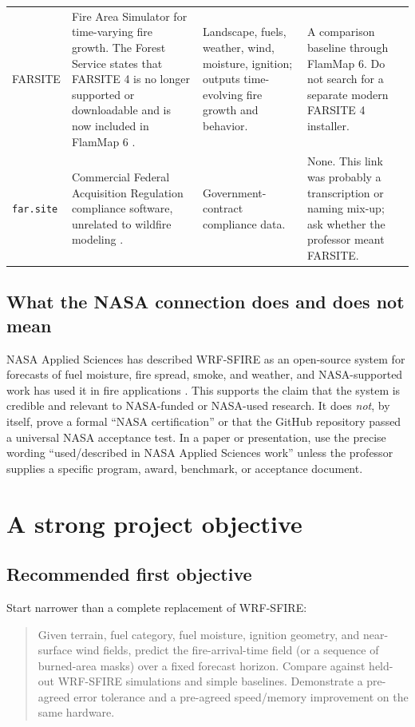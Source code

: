 \documentclass[11pt]{article}
\begin{document}
\begin{longtable}{p{}p{}p{}p{}}
\addlinespace
FARSITE & Fire Area Simulator for time-varying fire growth. The Forest Service states that FARSITE 4 is no longer supported or downloadable and is now included in FlamMap 6 \cite{farsite}. & Landscape, fuels, weather, wind, moisture, ignition; outputs time-evolving fire growth and behavior. & A comparison baseline through FlamMap 6. Do not search for a separate modern FARSITE 4 installer. \\
\addlinespace
\texttt{far.site} & Commercial Federal Acquisition Regulation compliance software, unrelated to wildfire modeling \cite{farsiteWrong}. & Government-contract compliance data. & None. This link was probably a transcription or naming mix-up; ask whether the professor meant FARSITE. \\
\bottomrule
\end{longtable}

\subsection{What the NASA connection does and does not mean}

NASA Applied Sciences has described WRF-SFIRE as an open-source system for forecasts of fuel moisture, fire spread, smoke, and weather, and NASA-supported work has used it in fire applications \cite{nasaFire}. This supports the claim that the system is credible and relevant to NASA-funded or NASA-used research. It does \emph{not}, by itself, prove a formal ``NASA certification'' or that the GitHub repository passed a universal NASA acceptance test. In a paper or presentation, use the precise wording ``used/described in NASA Applied Sciences work'' unless the professor supplies a specific program, award, benchmark, or acceptance document.

\section{A strong project objective}

\subsection{Recommended first objective}

Start narrower than a complete replacement of WRF-SFIRE:

\begin{quote}
Given terrain, fuel category, fuel moisture, ignition geometry, and near-surface wind fields, predict the fire-arrival-time field (or a sequence of burned-area masks) over a fixed forecast horizon. Compare against held-out WRF-SFIRE simulations and simple baselines. Demonstrate a pre-agreed error tolerance and a pre-agreed speed/memory improvement on the same hardware.
\end{quote}
\end{document}
